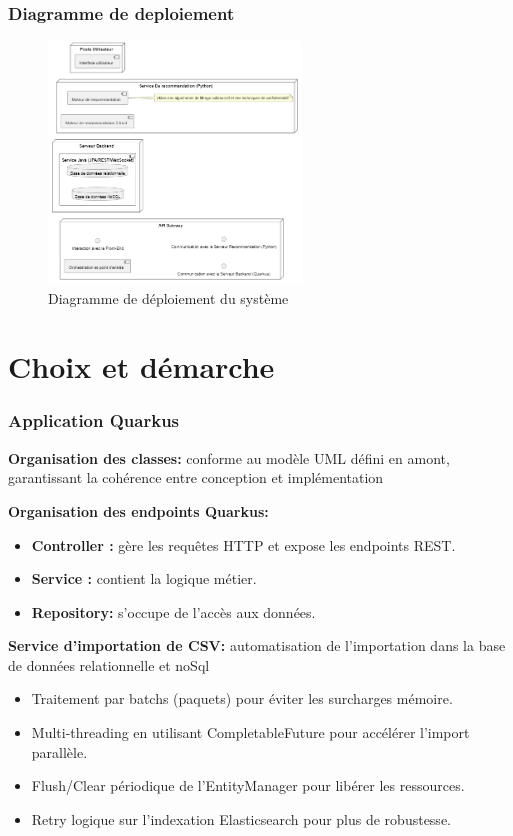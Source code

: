 \documentclass{beamer}
\begin{document}
\begin{frame}
    \frametitle{Diagramme de deploiement}
    \vspace{0.5cm}
    \begin{figure}
        \centering
        \includegraphics[width=0.60\textwidth]{deploiement.png}
        \caption{\small Diagramme de déploiement du système}
    \end{figure}
\end{frame}

\section{Choix et démarche}
\begin{frame}
    \scriptsize
    \frametitle{Application Quarkus}
    \textbf{Organisation des classes: }conforme au modèle UML défini en amont, garantissant la cohérence entre conception et implémentation


    \textbf{Organisation des endpoints Quarkus:}
    \begin{itemize}
        \item \textbf{Controller :}  gère les requêtes HTTP et expose les endpoints REST.
        \item \textbf{Service : }contient la logique métier.
        \item \textbf{Repository: } s'occupe de l'accès aux données.
    \end{itemize}

    \textbf{Service d'importation de CSV: }automatisation de l'importation dans la base de données relationnelle et noSql
    \begin{itemize}
        \item Traitement par batchs (paquets) pour éviter les surcharges mémoire.
        \item Multi-threading en utilisant CompletableFuture pour accélérer l'import parallèle.
        \item Flush/Clear périodique de l’EntityManager pour libérer les ressources.
        \item Retry logique sur l’indexation Elasticsearch pour plus de robustesse.
    \end{itemize}
\end{frame}
\end{document}
